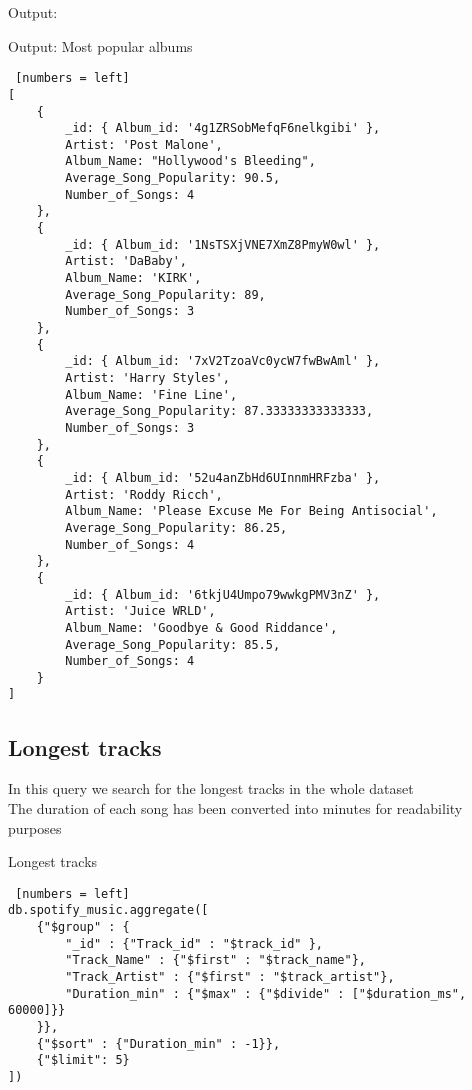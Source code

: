\documentclass{Configuration_Files/PoliMi3i_thesis}
\begin{document}
Output:
\begin{algorithm}[h!]
\caption{Output: Most popular albums}
\begin{lstlisting} [numbers = left]
[
	{
		_id: { Album_id: '4g1ZRSobMefqF6nelkgibi' },
		Artist: 'Post Malone',
		Album_Name: "Hollywood's Bleeding",
		Average_Song_Popularity: 90.5,
		Number_of_Songs: 4
	},
	{
		_id: { Album_id: '1NsTSXjVNE7XmZ8PmyW0wl' },
		Artist: 'DaBaby',
		Album_Name: 'KIRK',
		Average_Song_Popularity: 89,
		Number_of_Songs: 3
	},
	{
		_id: { Album_id: '7xV2TzoaVc0ycW7fwBwAml' },
		Artist: 'Harry Styles',
		Album_Name: 'Fine Line',
		Average_Song_Popularity: 87.33333333333333,
		Number_of_Songs: 3
	},
	{
		_id: { Album_id: '52u4anZbHd6UInnmHRFzba' },
		Artist: 'Roddy Ricch',
		Album_Name: 'Please Excuse Me For Being Antisocial',
		Average_Song_Popularity: 86.25,
		Number_of_Songs: 4
	},
	{
		_id: { Album_id: '6tkjU4Umpo79wwkgPMV3nZ' },
		Artist: 'Juice WRLD',
		Album_Name: 'Goodbye & Good Riddance',
		Average_Song_Popularity: 85.5,
		Number_of_Songs: 4
	}
]
\end{lstlisting}
\end{algorithm}
\newpage
\restoregeometry

\subsection{Longest tracks}
In this query we search for the longest tracks in the whole dataset\\
The duration of each song has been converted into minutes for readability purposes\\
\begin{algorithm}[ht]
\caption{Longest tracks}
\begin{lstlisting} [numbers = left]
db.spotify_music.aggregate([
	{"$group" : {
		"_id" : {"Track_id" : "$track_id" },
		"Track_Name" : {"$first" : "$track_name"},
		"Track_Artist" : {"$first" : "$track_artist"},
		"Duration_min" : {"$max" : {"$divide" : ["$duration_ms", 60000]}}
	}},
	{"$sort" : {"Duration_min" : -1}},
	{"$limit": 5}
])
\end{lstlisting}
\end{algorithm}
\newpage
\end{document}
